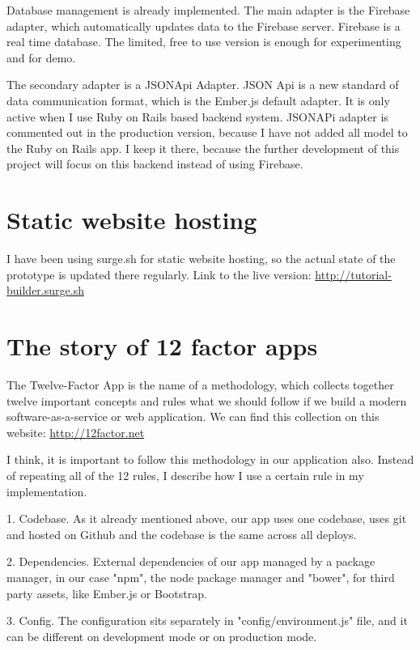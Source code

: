 \documentclass[12pt, a4paper, oneside, openright, medskipamount]{report}
\begin{document}
Database management is already implemented. The main adapter is the Firebase adapter, which automatically updates data to the Firebase server. Firebase is a real time database. The limited, free to use version is enough for experimenting and for demo.

The secondary adapter is a JSONApi Adapter. JSON Api \cite{jsonapi} is a new standard of data communication format, which is the Ember.js default adapter. It is only active when I use Ruby on Rails based backend system. JSONAPi adapter is commented out in the production version, because I have not added all model to the Ruby on Rails app. I keep it there, because the further development of this project will focus on this backend instead of using Firebase.

\section{Static website hosting}

I have been using surge.sh \cite{surge} for static website hosting, so the actual state of the prototype is updated there regularly. Link to the live version: \url{http://tutorial-builder.surge.sh}

\section{The story of 12 factor apps}

The Twelve-Factor App is the name of a methodology, which collects together twelve important concepts and rules what we should follow if we build a modern software-as-a-service or web application. We can find this collection on this website: \url{http://12factor.net}

I think, it is important to follow this methodology in our application also. Instead of repeating all of the 12 rules, I describe how I use a certain rule in my implementation.

1. Codebase. As it already mentioned above, our app uses one codebase, uses git and hosted on Github and the codebase is the same across all deploys.

2. Dependencies. External dependencies of our app managed by a package manager, in our case "npm", the node package manager and "bower", for third party assets, like Ember.js or Bootstrap.

3. Config. The configuration sits separately in "config/environment.js" file, and it can be different on development mode or on production mode.
\end{document}

